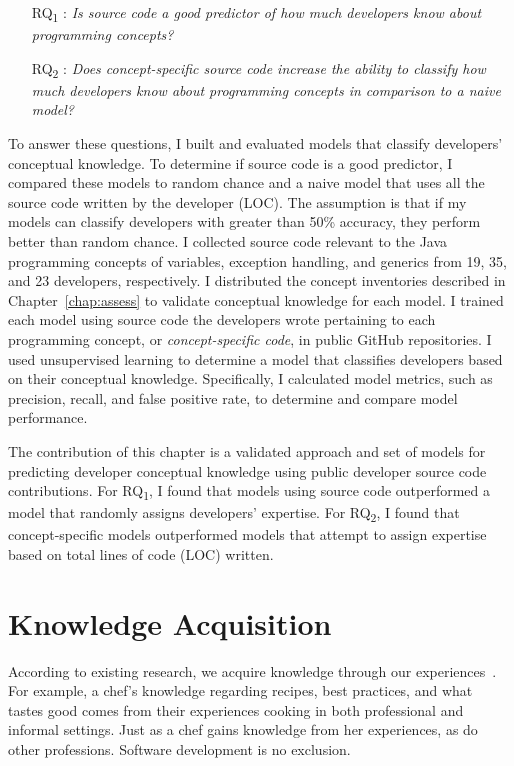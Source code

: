 \begin{itemize}
	\item [RQ\textsubscript{1}]: \textit{Is source code a good predictor of how much developers know about programming concepts?}
	\item [RQ\textsubscript{2}]: \textit{Does concept-specific source code increase the ability to classify how much developers know about programming concepts in comparison to a naive model?}
\end{itemize}

To answer these questions, I built and evaluated models that classify developers' conceptual knowledge. To determine if source code is a good predictor, I compared these models to random chance and a naive model that uses all the source code written by the developer (LOC).
The assumption is that if my models can classify developers with greater than 50\% accuracy, they perform better than random chance.
I collected source code relevant to the Java programming concepts of variables, exception handling, and generics from 19, 35, and 23 developers, respectively. 
I distributed the concept inventories described in Chapter~\ref{chap:assess} to validate conceptual knowledge for each model. 
I trained each model using source code the developers wrote pertaining to each programming concept, or \textit{concept-specific code}, in public GitHub repositories. 
I used unsupervised learning to determine a model that classifies developers based on their conceptual knowledge. 
Specifically, I calculated model metrics, such as precision, recall, and false positive rate, to determine and compare model performance.

The contribution of this chapter is a validated approach and set of models for predicting developer conceptual knowledge using public developer source code contributions. For RQ\textsubscript{1}, I found that models using source code outperformed a model that randomly assigns developers' expertise. For RQ\textsubscript{2}, I found that concept-specific models outperformed models that attempt to assign expertise based on total lines of code (LOC) written.

\section{Knowledge Acquisition}
According to existing research, we acquire knowledge through our experiences~\cite{argote2011organizational}. For example, a chef's knowledge regarding recipes, best practices, and what tastes good comes from their experiences cooking in both professional and informal settings. Just as a chef gains knowledge from her experiences, as do other professions. Software development is no exclusion.

